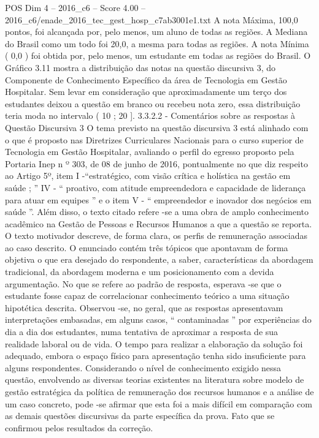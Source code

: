 \begin{textsample}{POS Dim 4 – 2016\_c6 – Score 4.00 – 2016\_c6/enade\_2016\_tec\_gest\_hosp\_c7ab3001e1.txt}
A nota Máxima, 100,0 pontos, foi alcançada por, pelo menos, um aluno de todas as regiões.
A Mediana do Brasil como um todo foi 20,0, a mesma para todas as regiões.
A nota Mínima ( 0,0 ) foi obtida por, pelo menos, um estudante em todas as regiões do Brasil.
O Gráfico 3.11 mostra a distribuição das notas na questão discursiva 3, do Componente de Conhecimento Específico da área de Tecnologia em Gestão Hospitalar.
Sem levar em consideração que aproximadamente um terço dos estudantes deixou a questão em branco ou recebeu nota zero, essa distribuição teria moda no intervalo ( 10 ; 20 ]. 3.3.2.2 - Comentários sobre as respostas à Questão Discursiva 3 O tema previsto na questão discursiva 3 está alinhado com o que é proposto nas Diretrizes Curriculares Nacionais para o curso superior de Tecnologia em Gestão Hospitalar, avaliando o perfil do egresso proposto pela Portaria Inep n º 303, de 08 de junho de 2016, pontualmente no que diz respeito ao Artigo 5º, item I -“estratégico, com visão crítica e holística na gestão em saúde ; ” IV - “ proativo, com atitude empreendedora e capacidade de liderança para atuar em equipes ” e o item V - “ empreendedor e inovador dos negócios em saúde ”.
Além disso, o texto citado refere -se a uma obra de amplo conhecimento acadêmico na Gestão de Pessoas e Recursos Humanos a que a questão se reporta.
O texto motivador descreve, de forma clara, os perfis de remuneração associadas ao caso descrito.
O enunciado contém três tópicos que apontavam de forma objetiva o que era desejado do respondente, a saber, características da abordagem tradicional, da abordagem moderna e um posicionamento com a devida argumentação.
No que se refere ao padrão de resposta, esperava -se que o estudante fosse capaz de correlacionar conhecimento teórico a uma situação hipotética descrita.
Observou -se, no geral, que as respostas apresentavam interpretações embasadas, em alguns casos, “ contaminadas ” por experiências do dia a dia dos estudantes, numa tentativa de aproximar a resposta de sua realidade laboral ou de vida.
O tempo para realizar a elaboração da solução foi adequado, embora o espaço físico para apresentação tenha sido insuficiente para alguns respondentes.
Considerando o nível de conhecimento exigido nessa questão, envolvendo as diversas teorias existentes na literatura sobre modelo de gestão estratégica da política de remuneração dos recursos humanos e a análise de um caso concreto, pode -se afirmar que esta foi a mais difícil em comparação com as demais questões discursivas da parte específica da prova.
Fato que se confirmou pelos resultados da correção.

\end{textsample}
